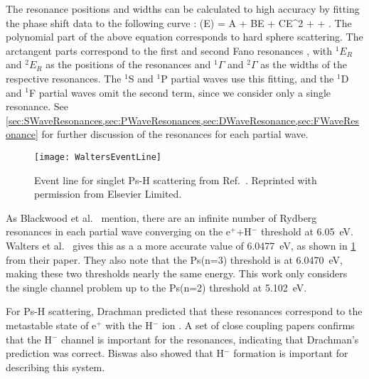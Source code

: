 \documentclass[Dissertation.tex]{subfiles}
\begin{document}
The resonance positions and widths can be calculated to high 
accuracy by fitting the phase shift data to the following curve \cite{VanReeth2004}:
\beq
\label{eq:ResonanceCurve}
\delta(E) = A + BE + CE^2 + \arctan{}
  + \arctan{}.
\eeq
The polynomial part of the above equation corresponds to hard sphere 
scattering. The arctangent parts correspond to the first and second Fano 
resonances \cite{Fano1961,Macek1970,Hazi1979}, with $^1E_R$ and $^2E_R$ as 
the positions of the resonances and $^1\Gamma$ and $^2\Gamma$ as the widths 
of the respective resonances. The $^1$S and $^1$P partial waves use this 
fitting, and the $^1$D and $^1$F partial waves omit the second term, since we 
consider only a single resonance. See
\cref{sec:SWaveResonances,sec:PWaveResonances,sec:DWaveResonance,sec:FWaveResonance}
for further discussion of the resonances for each partial wave.


\begin{figure}
	\centering
	\texttt{[image: WaltersEventLine]}
	\caption[Event line for singlet Ps-H scattering]{Event line for singlet Ps-H scattering
from Ref.~\cite{Walters2004}. Reprinted with permission from Elsevier Limited.}
	\label{fig:WaltersEventLine}
\end{figure}

As Blackwood et al.\ \cite{Blackwood2002} mention, there are an infinite 
number of Rydberg resonances in each partial wave converging on the e$^+$+H$^-$
threshold at \SI{6.05}{eV}. Walters et al.\ \cite{Walters2004} gives this as a
a more accurate value of \SI{6.0477}{eV}, as shown in \cref{fig:WaltersEventLine}
from their paper. They also note that the Ps(n=3)
threshold is at \SI{6.0470}{eV}, making these two thresholds nearly the same
energy. This work only considers the single channel problem up to the Ps(n=2)
threshold at \SI{5.102}{eV}.

For Ps-H scattering, Drachman predicted that these resonances correspond to 
the metastable state of e$^+$ with the H$^-$ ion \cite{Drachman1979}. A set 
of close coupling papers \cite{Blackwood2002,Blackwood2002b,Walters2004} 
confirms that the H$^-$ channel is important for the resonances, indicating 
that Drachman's prediction was correct. Biswas \cite{Biswas2001} also showed 
that H$^-$ formation is important for describing this system.
\end{document}

